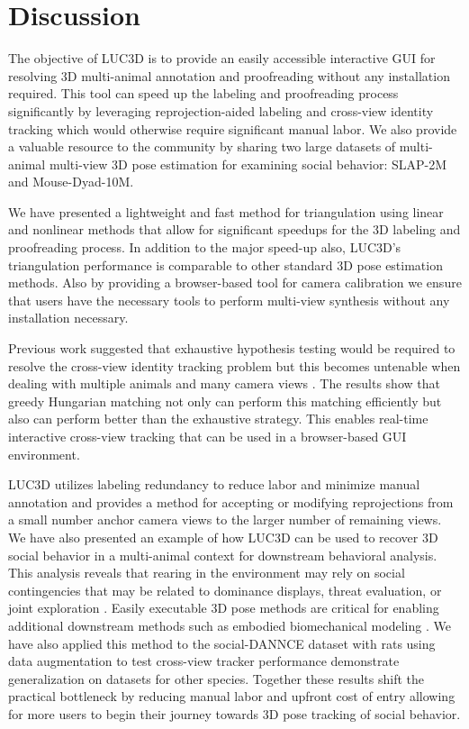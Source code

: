 \documentclass[pdflatex, sn-nature]{sn-jnl}
\theoremstyle{thmstyleone}%
\theoremstyle{thmstyletwo}%
\theoremstyle{thmstylethree}%
\begin{document}
\FloatBarrier

\section{Discussion}\label{sec3}

The objective of LUC3D is to provide an easily accessible interactive GUI for resolving 3D multi-animal annotation and proofreading without any installation required. This tool can speed up the labeling and proofreading process significantly by leveraging reprojection-aided labeling and cross-view identity tracking which would otherwise require significant manual labor. We also provide a valuable resource to the community by sharing two large datasets of multi-animal multi-view 3D pose estimation for examining social behavior: SLAP-2M and Mouse-Dyad-10M. 

We have presented a lightweight and fast method for triangulation using linear and nonlinear methods that allow for significant speedups for the 3D labeling and proofreading process. In addition to the major speed-up also, LUC3D's triangulation performance is comparable to other standard 3D pose estimation methods. Also by providing a browser-based tool for camera calibration we ensure that users have the necessary tools to perform multi-view synthesis without any installation necessary. 

Previous work suggested that exhaustive hypothesis testing would be required to resolve the cross-view identity tracking problem but this becomes untenable when dealing with multiple animals and many camera views \citep{Maree2024}. The results show that greedy Hungarian matching not only can perform this matching efficiently but also can perform better than the exhaustive strategy. This enables real-time interactive cross-view tracking that can be used in a browser-based GUI environment. 

LUC3D utilizes labeling redundancy to reduce labor and minimize manual annotation and provides a method for accepting or modifying reprojections from a small number anchor camera views to the larger number of remaining views. We have also presented an example of how LUC3D can be used to recover 3D social behavior in a multi-animal context for downstream behavioral analysis. This analysis reveals that rearing in the environment may rely on social contingencies that may be related to dominance displays, threat evaluation, or joint exploration \citep{Lever2006, Leonardis2022}. Easily executable 3D pose methods are critical for enabling additional downstream methods such as embodied biomechanical modeling \citep{Leonardis2025,Zhang2025}. We have also applied this method to the social-DANNCE dataset with rats using data augmentation to test cross-view tracker performance demonstrate generalization on datasets for other species. Together these results shift the practical bottleneck by reducing manual labor and upfront cost of entry allowing for more users to begin their journey towards 3D pose tracking of social behavior. 
\end{document}
